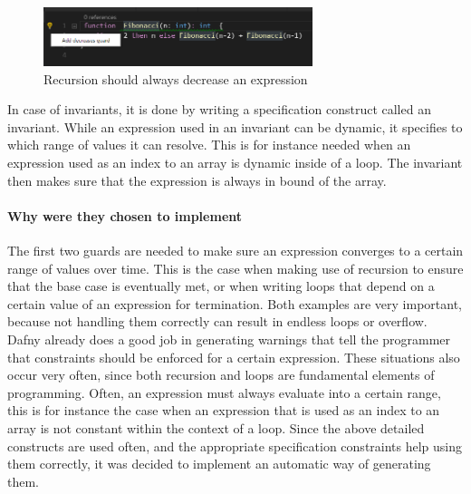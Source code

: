 \begin{figure}[H]
	\centering
	\includegraphics[width=0.7\textwidth]{img/decreaseGuard}
	\caption{Recursion should always decrease an expression}
	\label{fig:dfdecreaseguard}
\end{figure}

In case of invariants, it is done by writing a specification construct called an invariant. While an expression used in an invariant can be dynamic, it specifies to which range of values it can resolve. 
This is for instance needed when an expression used as an index to an array is dynamic inside of a loop. The invariant then makes sure that the expression is always in bound of the array. 

\paragraph{Why were they chosen to implement}
The first two guards are needed to  make sure an expression converges to a certain range of values over time. This is the case when making use of recursion to ensure that the base case is eventually met, or when writing loops that depend on a certain value of an expression for termination. Both examples are very important, because not handling them correctly can result in endless loops or overflow. Dafny already does a good job in generating warnings that tell the programmer that constraints should be enforced for a certain expression. These situations also occur very often, since both recursion and loops are fundamental elements of programming.\newline
Often, an expression must always evaluate into a certain range, this is for instance the case when an expression that is used as an index to an array is not constant within the context of a loop. \newline
Since the above detailed constructs are used often, and the appropriate specification constraints help using them correctly, it was decided to implement an automatic way of generating them. 

